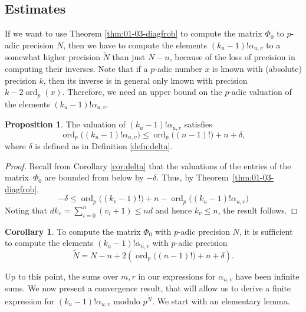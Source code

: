 \documentclass[a4paper,11pt]{article}
\numberwithin{equation}{section}
\DeclareMathOperator{\ord}{ord}          %
\theoremstyle{definition}
\newtheorem{prop}[thm]{Proposition}
\newtheorem{cor}[thm]{Corollary}
\begin{document}
\subsection{Estimates}

If we want to use Theorem \ref{thm:01-03-diagfrob} to compute the matrix 
$\Phi_0$ to $p$-adic precision $N$, then we have to compute the elements
$(k_u-1)!\alpha_{u,v}$ to a somewhat higher precision $\tilde{N}$ than just
$N-n$, because 
of the loss of precision in computing their inverses. Note that if a $p$-adic 
number $x$ is known with (absolute) precision $k$, then its inverse is in general 
only known with precision $k-2\ord_p(x)$. Therefore, we need an upper bound
on the $p$-adic valuation of the elements $(k_u-1)!\alpha_{u,v}$.

\begin{prop}
The valuation of $(k_u-1)! \alpha_{u,v}$ satisfies
\begin{equation*}
\ord_p\bigl((k_u-1)! \alpha_{u,v}\bigr) 
    \leq \ord_p\bigl((n-1)!\bigr) + n + \delta,
\end{equation*}
where $\delta$ is defined as in Definition \ref{defn:delta}. 
\end{prop}

\begin{proof}
Recall from Corollary \ref{cor:delta} that the valuations 
of the entries of the matrix~$\Phi_0$ are bounded from below by $-\delta$. 
Thus, by Theorem~\ref{thm:01-03-diagfrob}, 
\begin{equation*}
-\delta \leq \ord_p\bigl((k_v-1)!\bigr) + n 
           - \ord_p\bigl((k_u-1)! \alpha_{u,v}\bigr)
\end{equation*}
Noting that $d k_v = \sum_{i=0}^n (v_i + 1) \leq n d$ and 
hence $k_v \leq n$, the result follows.
\end{proof}

\begin{cor} \label{cor:Ntilde}
To compute the matrix $\Phi_0$ with $p$-adic precision $N$, it is sufficient to compute the elements 
$(k_u-1)!\alpha_{u,v}$ with $p$-adic precision
\begin{equation*}
\tilde{N}=N-n+2(\ord_p\bigl((n-1)!\bigr)+n+\delta).
\end{equation*}
\end{cor}

Up to this point, the sums over $m,r$ in our expressions 
for $\alpha_{u,v}$ have been infinite sums.  We now present 
a convergence result, that will allow us to derive a finite 
expression for $(k_u-1)!\alpha_{u,v}$ modulo $p^{\tilde{N}}$. We
start with an elementary lemma.
\end{document}
